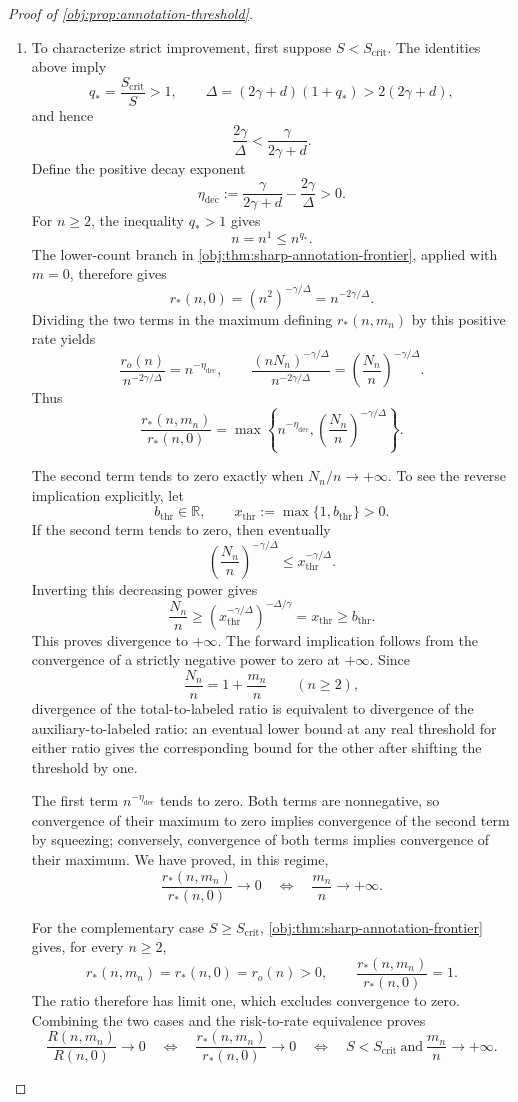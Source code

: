 \begin{proof}[Proof of \cref{obj:prop:annotation-threshold}]
\begin{enumerate}
\item
To characterize strict improvement, first suppose \(S<S_{\mathrm{crit}}\). The identities above imply
\[
q_*=\frac{S_{\mathrm{crit}}}{S}>1,
\qquad
\Delta=(2\gamma+d)(1+q_*)>2(2\gamma+d),
\]
and hence
\[
\frac{2\gamma}{\Delta}<\frac{\gamma}{2\gamma+d}.
\]
Define the positive decay exponent
\[
\eta_{\mathrm{dec}}
:=\frac{\gamma}{2\gamma+d}-\frac{2\gamma}{\Delta}>0.
\]
For \(n\ge2\), the inequality \(q_*>1\) gives
\[
n=n^1\le n^{q_*}.
\]
The lower-count branch in
\cref{obj:thm:sharp-annotation-frontier}, applied with \(m=0\), therefore gives
\[
r_*(n,0)=(n^2)^{-\gamma/\Delta}
=n^{-2\gamma/\Delta}.
\]
Dividing the two terms in the maximum defining \(r_*(n,m_n)\) by this positive rate yields
\[
\frac{r_o(n)}{n^{-2\gamma/\Delta}}
=n^{-\eta_{\mathrm{dec}}},
\qquad
\frac{(nN_n)^{-\gamma/\Delta}}{n^{-2\gamma/\Delta}}
=\left(\frac{N_n}{n}\right)^{-\gamma/\Delta}.
\]
Thus
\[
\frac{r_*(n,m_n)}{r_*(n,0)}
=
\max\left\{
n^{-\eta_{\mathrm{dec}}},
\left(\frac{N_n}{n}\right)^{-\gamma/\Delta}
\right\}.
\]

The second term tends to zero exactly when \(N_n/n\to+\infty\). To see the reverse implication explicitly, let
\[
b_{\mathrm{thr}}\in\mathbb R,
\qquad
x_{\mathrm{thr}}:=\max\{1,b_{\mathrm{thr}}\}>0.
\]
If the second term tends to zero, then eventually
\[
\left(\frac{N_n}{n}\right)^{-\gamma/\Delta}
\le x_{\mathrm{thr}}^{-\gamma/\Delta}.
\]
Inverting this decreasing power gives
\[
\frac{N_n}{n}
\ge
\left(x_{\mathrm{thr}}^{-\gamma/\Delta}\right)^{-\Delta/\gamma}
=x_{\mathrm{thr}}
\ge b_{\mathrm{thr}}.
\]
This proves divergence to \(+\infty\). The forward implication follows from the convergence of a strictly negative power to zero at \(+\infty\). Since
\[
\frac{N_n}{n}=1+\frac{m_n}{n}\qquad(n\ge2),
\]
divergence of the total-to-labeled ratio is equivalent to divergence of the auxiliary-to-labeled ratio: an eventual lower bound at any real threshold for either ratio gives the corresponding bound for the other after shifting the threshold by one.

The first term \(n^{-\eta_{\mathrm{dec}}}\) tends to zero. Both terms are nonnegative, so convergence of their maximum to zero implies convergence of the second term by squeezing; conversely, convergence of both terms implies convergence of their maximum. We have proved, in this regime,
\[
\frac{r_*(n,m_n)}{r_*(n,0)}\longrightarrow0
\quad\Longleftrightarrow\quad
\frac{m_n}{n}\longrightarrow+\infty.
\]

For the complementary case \(S\ge S_{\mathrm{crit}}\),
\cref{obj:thm:sharp-annotation-frontier} gives, for every \(n\ge2\),
\[
r_*(n,m_n)=r_*(n,0)=r_o(n)>0,
\qquad
\frac{r_*(n,m_n)}{r_*(n,0)}=1.
\]
The ratio therefore has limit one, which excludes convergence to zero. Combining the two cases and the risk-to-rate equivalence proves
\[
\frac{R(n,m_n)}{R(n,0)}\longrightarrow0
\quad\Longleftrightarrow\quad
\frac{r_*(n,m_n)}{r_*(n,0)}\longrightarrow0
\quad\Longleftrightarrow\quad
S<S_{\mathrm{crit}}
\ \text{and}\ 
\frac{m_n}{n}\longrightarrow+\infty.
\]


\end{enumerate}
\end{proof}
